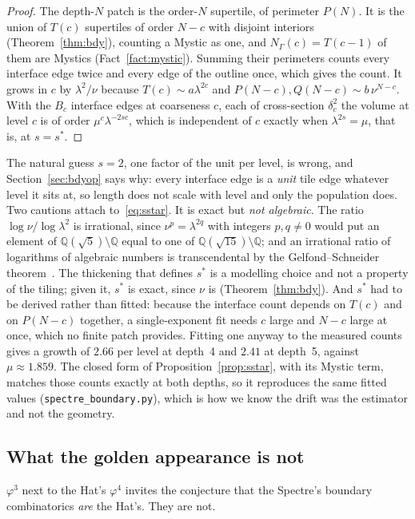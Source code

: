 \documentclass[11pt]{article}
\theoremstyle{definition}
\theoremstyle{remark}
\newcommand{\lam}{\lambda}
\newcommand{\code}[1]{\texttt{#1}}
\begin{document}
\begin{proof}
The depth-$N$ patch is the order-$N$ supertile, of perimeter $P(N)$.  It is the union of $T(c)$ supertiles of order
$N-c$ with disjoint interiors (Theorem~\ref{thm:bdy}), counting a Mystic as one, and $N_{\Gamma}(c)=T(c-1)$ of them are
Mystics (Fact~\ref{fact:mystic}).  Summing their perimeters counts every interface edge twice and every edge of the
outline once, which gives the count.  It grows in $c$ by $\lam^{2}/\nu$ because $T(c)\sim a\lam^{2c}$ and
$P(N-c),Q(N-c)\sim b\,\nu^{N-c}$.  With the $B_{c}$ interface edges at coarseness $c$, each of cross-section $\delta_{c}^{2}$ the volume at level $c$ is of order
$\mu^{c}\lam^{-2sc}$, which is independent of $c$ exactly when $\lam^{2s}=\mu$, that is, at $s=s^{*}$.
\end{proof}

\noindent
The natural guess $s=2$, one factor of the unit per level, is wrong, and
Section~\ref{sec:bdyop} says why: every interface edge is a \emph{unit} tile edge
whatever level it sits at, so length does not scale with level and only the
population does.  Two cautions attach to~\eqref{eq:sstar}.  It is exact but
\emph{not algebraic}.  The ratio $\log\nu/\log\lam^{2}$ is irrational, since $\nu^{p}=\lam^{2q}$
with integers $p,q\ne0$ would put an element of $\mathbb{Q}(\sqrt5)\setminus\mathbb{Q}$ equal to one of
$\mathbb{Q}(\sqrt{15})\setminus\mathbb{Q}$; and an irrational ratio of logarithms of algebraic numbers is
transcendental by the Gelfond--Schneider theorem~\cite{Gelfond}.  The thickening that defines
$s^{*}$ is a modelling choice and not a property of the tiling; given it, $s^{*}$ is exact,
since $\nu$ is (Theorem~\ref{thm:bdy}).  And $s^{*}$ had to be derived rather than
fitted: because the interface count depends on $T(c)$ and on $P(N-c)$ together,
a single-exponent fit needs $c$ large and $N-c$ large at once, which no finite
patch provides.  Fitting one anyway to the measured counts gives a growth of
$2.66$ per level at depth~4 and $2.41$ at depth~5, against $\mu\approx1.859$.  The
closed form of Proposition~\ref{prop:sstar}, with its Mystic term, matches those
counts exactly at both depths, so it reproduces the same fitted values
(\code{spectre\_boundary.py}), which is how we know the drift was the estimator
and not the geometry.
\subsection{What the golden appearance is not}

$\varphi^{3}$ next to the Hat's $\varphi^{4}$ invites the conjecture that the
Spectre's boundary combinatorics \emph{are} the Hat's.  They are not.
\end{document}
